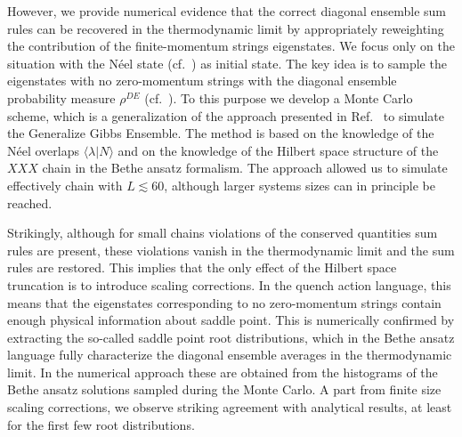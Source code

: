 \documentclass[11pt]{iopart}
\begin{document}
However, we provide numerical evidence that the correct diagonal ensemble 
sum rules can be recovered in the thermodynamic limit by appropriately 
reweighting the contribution of the finite-momentum strings eigenstates.  
We focus only on the situation with the N\'eel state (cf.~) as 
initial state. The key idea is to sample the eigenstates with no zero-momentum 
strings with the diagonal ensemble probability measure $\rho^{DE}$ (cf.~). 
To this purpose we develop a Monte Carlo scheme, which is a generalization of 
the approach presented in Ref.~\cite{alba-2015} to simulate the Generalize 
Gibbs Ensemble. The method is based on the knowledge of the N\'eel overlaps 
$\langle\lambda|N\rangle$ and on the knowledge of the Hilbert space structure 
of the $XXX$ chain in the Bethe ansatz formalism. The approach allowed us to 
simulate effectively chain with $L\lesssim 60$, although larger systems 
sizes can in principle be reached. 

Strikingly, although for small chains violations of the conserved quantities 
sum rules are present, these violations vanish in the thermodynamic limit 
and the sum rules are restored. This implies that the only effect of the 
Hilbert space truncation is to introduce scaling corrections. In the quench 
action language, this means that the eigenstates corresponding to no 
zero-momentum strings contain enough physical information about saddle point. 
This is numerically confirmed by extracting the so-called saddle point 
root distributions, which in the Bethe ansatz language fully characterize 
the diagonal ensemble averages in the thermodynamic limit. In the numerical  
 approach these are obtained from the histograms of the Bethe ansatz 
solutions sampled during the Monte Carlo. A part from finite size scaling 
corrections, we observe striking agreement with analytical results, at least 
for the first few root distributions. 






%
%
\end{document}
